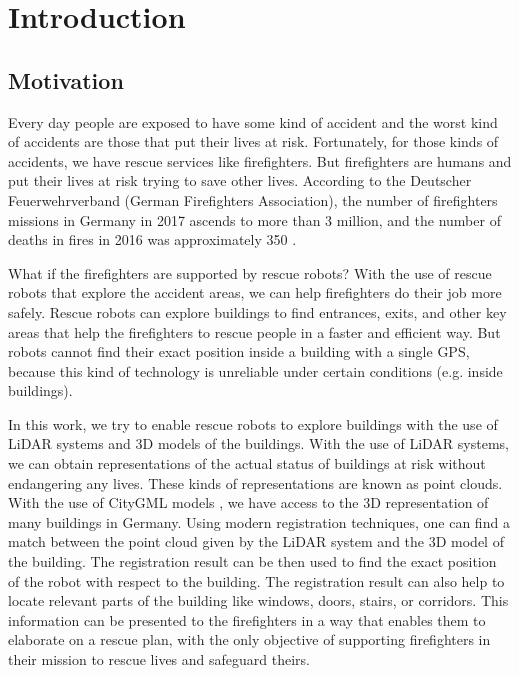 

    \chapter{Introduction}

    
    \section{Motivation}
    
        Every day people are exposed to have some kind of accident and the worst kind of accidents are those that put their lives at risk.
        Fortunately, for those kinds of accidents, we have rescue services like firefighters.
        But firefighters are humans and put their lives at risk trying to save other lives.
        According to the Deutscher Feuerwehrverband (German Firefighters Association), the number of firefighters missions in Germany in 2017 
        ascends to more than 3 million, and the number of deaths in fires in 2016 was approximately 350 \cite{DeutscherFeuerweherverband_online}.
        \par
        What if the firefighters are supported by rescue robots?
        With the use of rescue robots that explore the accident areas, we can help firefighters do their job more safely.
        Rescue robots can explore buildings to find entrances, exits, and other key areas that help the firefighters to rescue people in a faster and efficient way.
        But robots cannot find their exact position inside a building with a single GPS, because this kind of technology is unreliable under certain conditions 
        (e.g. inside buildings).
        \par
        In this work, we try to enable rescue robots to explore buildings with the use of LiDAR systems and 3D models of the buildings.
        With the use of LiDAR systems, we can obtain representations of the actual status of buildings at risk without endangering any lives. 
        These kinds of representations are known as point clouds.
        With the use of CityGML models \cite{Groger_2012_OGC}, we have access to the 3D representation of many buildings in Germany.
        Using modern registration techniques, one can find a match between the point cloud given by the LiDAR system and the 3D model of the building.
        The registration result can be then used to find the exact position of the robot with respect to the building.
        The registration result can also help to locate relevant parts of the building like windows, doors, stairs, or corridors.
        This information can be presented to the firefighters in a way that enables them to elaborate on a rescue plan, with the only objective of 
        supporting firefighters in their mission to rescue lives and safeguard theirs.



